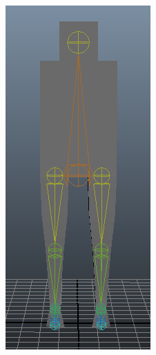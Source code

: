 \begin{figure}[htp]
\begin{subfigure}[b]{0.41\textwidth}
	\end{subfigure}
	\begin{subfigure}[b]{0.3\textwidth}
		\includegraphics[width=\textwidth]{images/simpleSkeleton2Screen2Cropped.png}

\end{subfigure}
\end{figure}
